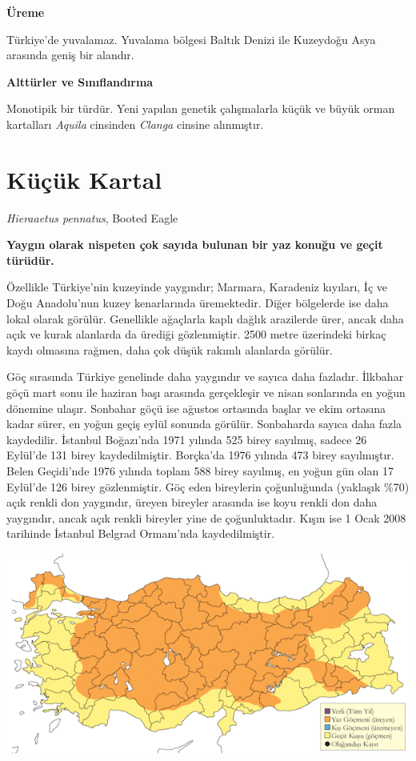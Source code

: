 \documentclass[
  letterpaper,
  DIV=11,
  numbers=noendperiod]{scrreprt}
\begin{document}
\textbf{Üreme}

Türkiye'de yuvalamaz. Yuvalama bölgesi Baltık Denizi ile Kuzeydoğu Asya
arasında geniş bir alandır.

\textbf{Alttürler ve Sınıflandırma}

Monotipik bir türdür. Yeni yapılan genetik çalışmalarla küçük ve büyük
orman kartalları \emph{Aquila} cinsinden \emph{Clanga} cinsine
alınmıştır.

\section{Küçük Kartal}\label{kuxfcuxe7uxfck-kartal}

\emph{Hieraaetus pennatus}, Booted Eagle

\textbf{Yaygın olarak nispeten çok sayıda bulunan bir yaz konuğu ve
geçit türüdür.}

Özellikle Türkiye'nin kuzeyinde yaygındır; Marmara, Karadeniz kıyıları,
İç ve Doğu Anadolu'nun kuzey kenarlarında üremektedir. Diğer bölgelerde
ise daha lokal olarak görülür. Genellikle ağaçlarla kaplı dağlık
arazilerde ürer, ancak daha açık ve kurak alanlarda da ürediği
gözlenmiştir. 2500 metre üzerindeki birkaç kaydı olmasına rağmen, daha
çok düşük rakımlı alanlarda görülür.

Göç sırasında Türkiye genelinde daha yaygındır ve sayıca daha fazladır.
İlkbahar göçü mart sonu ile haziran başı arasında gerçekleşir ve nisan
sonlarında en yoğun dönemine ulaşır. Sonbahar göçü ise ağustos ortasında
başlar ve ekim ortasına kadar sürer, en yoğun geçiş eylül sonunda
görülür. Sonbaharda sayıca daha fazla kaydedilir. İstanbul Boğazı'nda
1971 yılında 525 birey sayılmış, sadece 26 Eylül'de 131 birey
kaydedilmiştir. Borçka'da 1976 yılında 473 birey sayılmıştır. Belen
Geçidi'nde 1976 yılında toplam 588 birey sayılmış, en yoğun gün olan 17
Eylül'de 126 birey gözlenmiştir. Göç eden bireylerin çoğunluğunda
(yaklaşık \%70) açık renkli don yaygındır, üreyen bireyler arasında ise
koyu renkli don daha yaygındır, ancak açık renkli bireyler yine de
çoğunluktadır. Kışın ise 1 Ocak 2008 tarihinde İstanbul Belgrad
Ormanı'nda kaydedilmiştir.

\includegraphics{images/harita_Page_093.png}
\end{document}
